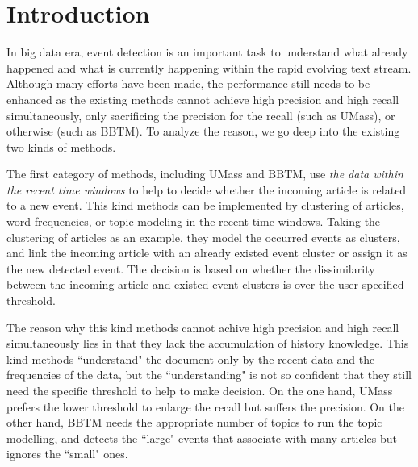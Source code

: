 \documentclass[conference,compsoc]{IEEEtran}
\begin{document}

\section{Introduction}

In big data era, event detection is an important task to understand what already happened\cite{ge2015bring} and what is currently happening\cite{hughes2009twitter}\cite{sakaki2010earthquake} within the rapid evolving text stream. 
Although many efforts have been made, the performance still needs to be enhanced as the existing methods cannot achieve high precision and high recall simultaneously, only sacrificing the precision for the recall (such as UMass\cite{Allan:2000wu}), or otherwise (such as BBTM\cite{yan2015probabilistic}).
To analyze the reason, we go deep into the existing two kinds of methods.

The first category of methods, including UMass\cite{Allan:2000wu} and BBTM\cite{yan2015probabilistic}, use \textit{the data within the recent time windows} to help to decide whether the incoming article is related to a new event. 
This kind methods can be implemented by clustering of articles\cite{Allan:2000wu}\cite{Petrovic:2010uj}\cite{Wurzer:2015wq}, word frequencies\cite{Mathioudakis:2010fc}\cite{Weng:2011wz}, or topic modeling\cite{Diao:2012wj}\cite{Yan:2015wm} in the recent time windows. 
Taking the clustering of articles as an example, they model the occurred events as clusters, and link the incoming article with an already existed event cluster or assign it as the new detected event.
The decision is based on whether the dissimilarity between the incoming article and existed event clusters is over the user-specified threshold. 

The reason why this kind methods cannot achive high precision and high recall simultaneously lies in that they lack the accumulation of history knowledge. 
This kind methods ``understand" the document only by the recent data and the frequencies of the data, but the ``understanding" is not so confident that they still need the specific threshold to help to make decision. 
On the one hand, UMass\cite{Allan:2000wu} prefers the lower threshold to enlarge the recall but suffers the precision. 
On the other hand, BBTM needs the appropriate number of topics to run the topic modelling, and detects the ``large" events that associate with many articles but ignores the ``small" ones. 
\end{document}
